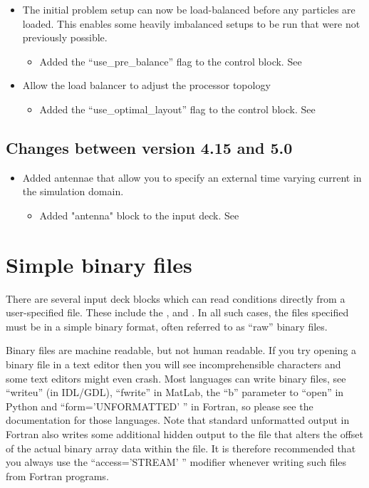 \begin{itemize}
\item The initial problem setup can now be load-balanced before any particles
    are loaded. This enables some heavily imbalanced setups to be run that were
    not previously possible.
\begin{itemize}
\item Added the ``use\_pre\_balance'' flag to the control block.
    See 
\end{itemize}
\item Allow the load balancer to adjust the processor topology
\begin{itemize}
\item Added the ``use\_optimal\_layout'' flag to the control block.
    See 
\end{itemize}
\end{itemize}
\bigskip


\subsection{Changes between version 4.15 and 5.0}

\begin{itemize}
\item Added antennae that allow you to specify an external time varying current
    in the simulation domain.
\begin{itemize}
\item Added "antenna" block to the input deck. See 
\end{itemize}
\end{itemize}
\bigskip


\section{Simple binary files}
\label{sec:binaryfile}
There are several input deck blocks which can read conditions directly from
a user-specified file. These include the ,
 and . In all such cases,
the files specified must be in a simple binary format, often referred to
as ``raw'' binary files.

Binary files are machine readable, but not human readable. If you try opening
a binary file in a text editor then you will see incomprehensible characters
and some text editors might even crash. Most languages can write binary files,
see ``writeu'' (in IDL/GDL), ``fwrite'' in MatLab, the ``b'' parameter to
``open'' in Python and ``form='UNFORMATTED' '' in Fortran, so please see the
documentation for those languages. Note that standard unformatted output in
Fortran also writes some additional hidden output to the file that alters the
offset of the actual binary array data within the file. It is therefore
recommended that you always use the ``access='STREAM' '' modifier whenever
writing such files from Fortran programs.

